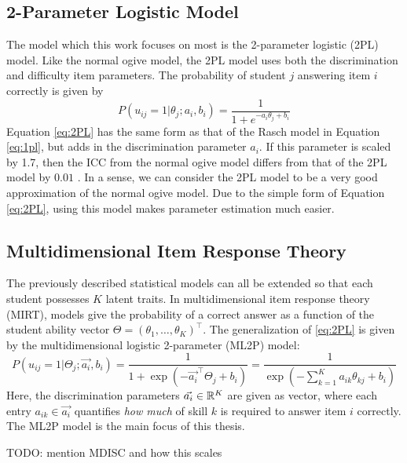 \subsection{2-Parameter Logistic Model}
The model which this work focuses on most is the 2-parameter logistic (2PL) model. Like the normal ogive model, the 2PL model uses both the discrimination and difficulty item parameters. The probability of student $j$ answering item $i$ correctly is given by
\begin{equation}
  P(u_{ij} = 1 | \theta_j; a_i, b_i) = \frac{1}{1 + e^{-a_i \theta_j + b_i}}
  \label{eq:2PL}
\end{equation}
Equation \ref{eq:2PL} has the same form as that of the Rasch model in Equation \ref{eq:1pl}, but adds in the discrimination parameter $a_i$. If this parameter is scaled by 1.7, then the ICC from the normal ogive model differs from that of the 2PL model by $0.01$ \cite{baker_kim2004}. In a sense, we can consider the 2PL model to be a very good approximation of the normal ogive model. Due to the simple form of Equation \ref{eq:2PL}, using this model makes parameter estimation much easier.

\subsection{Multidimensional Item Response Theory}
The previously described statistical models can all be extended so that each student possesses $K$ latent traits. In multidimensional item response theory (MIRT), models give the probability of a correct answer as a function of the student ability vector $\Theta = (\theta_1,\ldots, \theta_K)^\top$. The generalization of \ref{eq:2PL} is given by the multidimensional logistic 2-parameter (ML2P) model:
\begin{equation}
P(u_{ij} = 1 | \Theta_j; \vec{a_i}, b_i) = \frac{1}{1 + \exp\left(-\vec{a_i}^\top \Theta_j + b_i\right)} = \frac{1}{\exp\left(-\sum_{k=1}^K a_{ik} \theta_{kj} + b_i \right)}
  \label{eq:ml2p}
\end{equation}
Here, the discrimination parameters $\vec{a_i} \in \mathbb{R}^K$ are given as vector, where each entry $a_{ik} \in \vec{a_i}$ quantifies \textit{how much} of skill $k$ is required to answer item $i$ correctly. The ML2P model is the main focus of this thesis.

TODO: mention MDISC and how this scales

